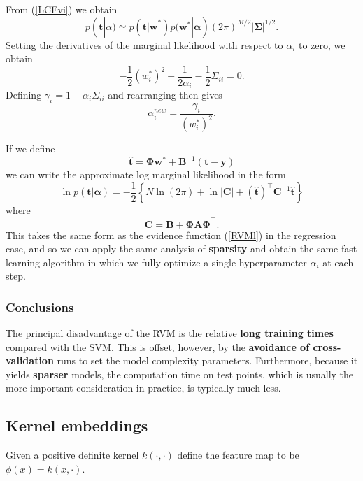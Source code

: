 \documentclass[a4paper]{book}
\renewcommand{\bf}{\mathbf}
\newcommand{\bs}{\boldsymbol}
\begin{document}
From (\ref{LCEvi}) we obtain
\begin{equation}
	p(\bf{t}|\alpha) \simeq p(\bf{t|w}^*)p(\bf{w}^*|\bs{\alpha})(2\pi)^{M/2}|\bs{\Sigma}|^{1/2}.
\end{equation}
Setting the derivatives of the marginal likelihood with respect to $\alpha_i$ to zero, we obtain
\begin{equation}
	-\frac{1}{2}(w_i^*)^2 + \frac{1}{2\alpha_i}-\frac{1}{2}\Sigma_{ii} = 0.
\end{equation}
Defining $\gamma_i = 1-\alpha_i \Sigma_{ii}$ and rearranging then gives
\begin{equation}
	\alpha_i^{new} = \frac{\gamma_i}{(w_i^*)^2}.
\end{equation}

If we define
\begin{equation}
	\hat{\bf{t}} = \bs{\Phi} \bf{w}^* + \bf{B}^{-1}(\bf{t-y})
\end{equation}
we can write the approximate log marginal likelihood in the form
\begin{equation}
	\ln p(\bf{t}|\bs{\alpha}) = -\frac{1}{2}\left\{ N \ln(2\pi) + \ln |\bf{C}| + (\hat{\bf{t}})^{\intercal} \bf{C}^{-1} \hat{\bf{t}} \right\}
\end{equation}
where
\begin{equation}
	\bf{C=B}+\bs{\Phi}\bf{A}\bs{\Phi}^{\intercal}.
\end{equation}
This takes the same form as the evidence function (\ref{RVMl}) in the regression case, and so we can apply the same analysis of \textbf{sparsity} and obtain the same fast learning algorithm in which we fully optimize a single hyperparameter $\alpha_i$ at each step.
\subsubsection{Conclusions}
The principal disadvantage of the RVM is the relative \textbf{long training times} compared with the SVM. This is offset, however, by the \textbf{avoidance of cross-validation} runs to set the model complexity parameters. Furthermore, because it yields \textbf{sparser} models, the computation time on test points, which is usually the more important consideration in practice, is typically much less.

\subsection{Kernel embeddings}

Given a positive definite kernel $k(\cdot,\cdot)$ define the feature map to be $\phi(x) = k(x,\cdot)$. 
\end{document}
